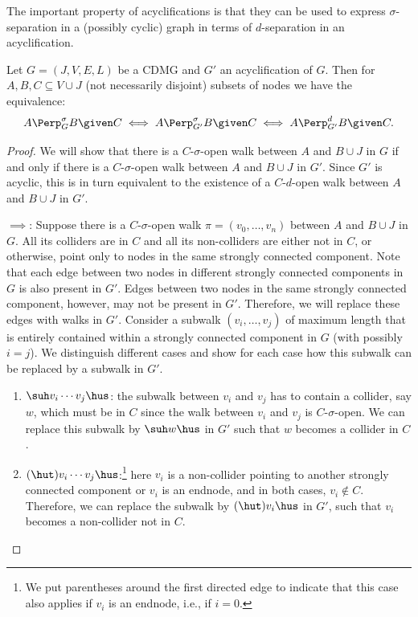 The important property of acyclifications is that they can be used to express $\sigma$-separation in a (possibly cyclic) graph
in terms of $d$-separation in an acyclification.

\begin{Prp}\label{prp:sigma_sep_as_d_sep}
  Let $G = ( J, V, E, L)$ be a CDMG and $G'$ an acyclification of $G$. 
  Then for $A, B, C \subseteq V \cup J$ (not necessarily disjoint) subsets of nodes we have the equivalence:
  \[A \Perp^\sigma_G B \given C \iff A \Perp^\sigma_{G'} B \given C \iff A \Perp^d_{G'} B \given C.\]
\end{Prp}

\begin{proof}
We will show that there is a $C$-$\sigma$-open walk between $A$ and $B \cup J$ in $G$ if and only
if there is a $C$-$\sigma$-open walk between $A$ and $B \cup J$ in $G'$. Since $G'$ is acyclic, this
is in turn equivalent to the existence of a $C$-$d$-open walk between $A$ and $B \cup J$ in $G'$.

$\implies$: Suppose there is a $C$-$\sigma$-open walk $\pi = (v_0, \dots, v_n)$ between $A$ and $B \cup J$ in $G$. 
All its colliders are in $C$
and all its non-colliders are either not in $C$, or otherwise, point only to nodes in the same strongly connected component.
Note that each edge between two nodes in different strongly connected components in $G$ is also present in $G'$.
Edges between two nodes in the same strongly connected component, however, may not be present in $G'$.
Therefore, we will replace these edges with walks in $G'$. 
Consider a subwalk $(v_i,\dots,v_j)$ of maximum length that is entirely contained within a strongly connected component in $G$
(with possibly $i=j$).
We distinguish different cases and show for each case how this subwalk can be replaced by a subwalk in $G'$.
\begin{enumerate}[label=(\roman*)]
  \item 
$\suh v_i \cdots v_j \hus$: the subwalk between $v_i$ and $v_j$ has to contain a collider, say $w$,
which must be in $C$ since the walk between $v_i$ and $v_j$ is $C$-$\sigma$-open.
We can replace this subwalk by $\suh w \hus$ in $G'$ such that $w$ becomes a collider in $C$.

\item
$(\hut) v_i \cdots v_j \hus$:\footnote{We put parentheses around the first directed edge to indicate that
this case also applies if $v_i$ is an endnode, i.e., if $i = 0$.} 
here $v_i$ is a non-collider pointing to another strongly connected component or $v_i$ is an endnode,
and in both cases, $v_i \notin C$. Therefore, we can replace the subwalk by $(\hut) v_i \hus$ in $G'$,
such that $v_i$ becomes a non-collider not in $C$.


\end{enumerate}
\end{proof}
